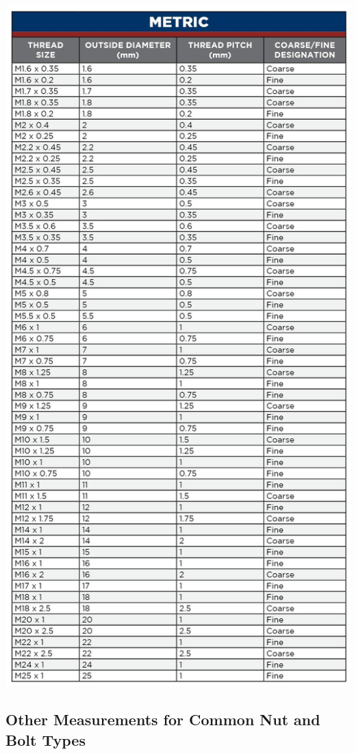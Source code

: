 \documentclass[english,]{article}
\begin{document}
\includegraphics{Introduction to Nut and Bolt Sizes_files/6307baf81ff28690984895.jpg}

\hypertarget{iqru7da}{%
\subsection{Other Measurements for Common Nut and Bolt
Types}\label{iqru7da}}
\end{document}
